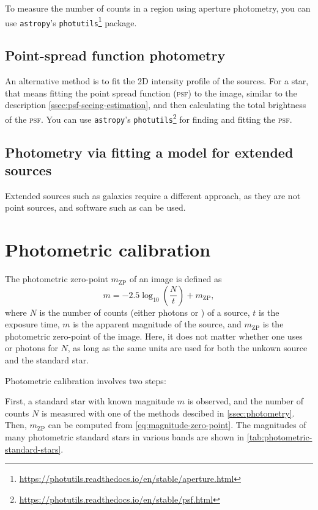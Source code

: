 \documentclass[a4paper, 11pt, fleqn]{memoir}
\begin{document}
To measure the number of counts in a region using aperture photometry, you can use \texttt{astropy}'s \texttt{photutils}\footnote{\url{https://photutils.readthedocs.io/en/stable/aperture.html}} package.

\subsection{Point-spread function photometry}
\label{ssec:psf-photometry}

An alternative method is to fit the 2D intensity profile of the sources.
For a star, that means fitting the point spread function (\textsc{psf}) to the image, similar to the description \cref{ssec:psf-seeing-estimation}, and then calculating the total brightness of the \textsc{psf}.
You can use \texttt{astropy}'s \texttt{photutils}\footnote{\url{https://photutils.readthedocs.io/en/stable/psf.html}} for finding and fitting the \textsc{psf}.


\subsection{Photometry via fitting a model for extended sources}
Extended sources such as galaxies require a different approach, as they are not point sources, and software such as  can be used.


\section{Photometric calibration}
\label{ssec:photometric-calibration}

The photometric zero-point $m_\text{ZP}$ of an image is defined as
\begin{equation}
    \label{eq:magnitude-zero-point}
    m = -2.5 \log_{10} \left( \frac{N}{t} \right) + m_\text{ZP},
\end{equation}
where $N$ is the number of counts (either photons or \si{\adu}) of a source, $t$ is the exposure time, $m$ is the apparent magnitude of the source, and $m_\text{ZP}$ is the photometric zero-point of the image.
Here, it does not matter whether one uses \si{\adu} or photons for $N$, as long as the same units are used for both the unkown source and the standard star.

Photometric calibration involves two steps:

First, a standard star with known magnitude $m$ is observed, and the number of counts $N$ is measured with one of the methods descibed in \cref{ssec:photometry}. Then, $m_\text{ZP}$ can be computed from \cref{eq:magnitude-zero-point}.
The magnitudes of many photometric standard stars in various bands are shown in \cref{tab:photometric-standard-stars}.
\end{document}
